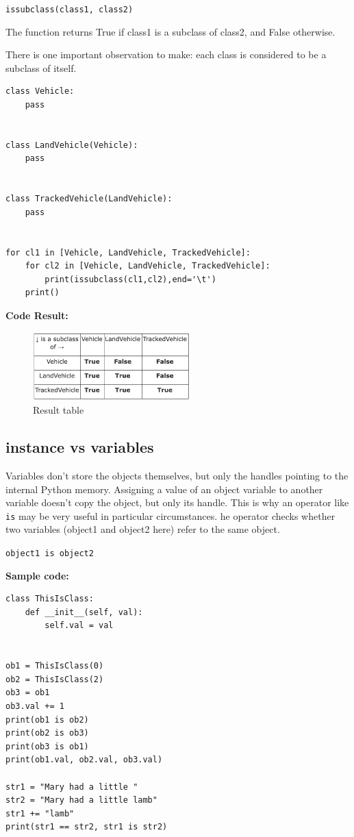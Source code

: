 \documentclass[11pt]{article}
\begin{document}
\texttt{issubclass(class1, class2)}

The function returns True if class1 is a subclass of class2, and False
otherwise.

There is one important observation to make: each class is considered
to be a subclass of itself.

\begin{verbatim}
class Vehicle:
	pass


class LandVehicle(Vehicle):
	pass


class TrackedVehicle(LandVehicle):
	pass


for cl1 in [Vehicle, LandVehicle, TrackedVehicle]:
	for cl2 in [Vehicle, LandVehicle, TrackedVehicle]:
		print(issubclass(cl1,cl2),end='\t')
	print()

\end{verbatim}

\textbf{Code Result:}

\begin{figure}[htbp]
\centering
\includegraphics[width=230px]{./images/subclasses.png}
\caption{Result table}
\end{figure}
\subsection{instance vs variables}
\label{sec:orgcc8d34f}
Variables don’t store the objects themselves, but only the handles
pointing to the internal Python memory. Assigning a value of an object
variable to another variable doesn’t copy the object, but only its
handle. This is why an operator like \texttt{is} may be very useful in
particular circumstances. he operator checks whether two variables
(object1 and object2 here) refer to the same object.

\texttt{object1 is object2}
\vspace{10 mm}

\textbf{Sample code:}

\begin{verbatim}
class ThisIsClass:
	def __init__(self, val):
		self.val = val


ob1 = ThisIsClass(0)
ob2 = ThisIsClass(2)
ob3 = ob1
ob3.val += 1
print(ob1 is ob2)
print(ob2 is ob3)
print(ob3 is ob1)
print(ob1.val, ob2.val, ob3.val)

str1 = "Mary had a little "
str2 = "Mary had a little lamb"
str1 += "lamb"
print(str1 == str2, str1 is str2)

\end{verbatim}
\end{document}
